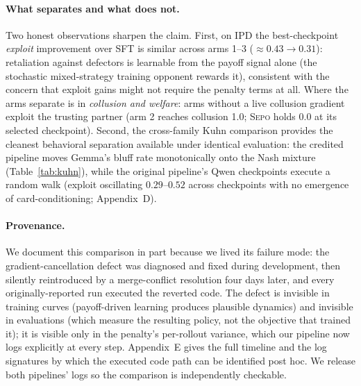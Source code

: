 \documentclass[letterpaper]{article} %
\newcommand{\sepo}{\textsc{Sepo}}
\begin{document}
\paragraph{What separates and what does not.} Two honest observations sharpen the claim. First, on IPD the best-checkpoint \emph{exploit} improvement over SFT is similar across arms 1--3 (${\approx}0.43 \to 0.31$): retaliation against defectors is learnable from the payoff signal alone (the stochastic mixed-strategy training opponent rewards it), consistent with the concern that exploit gains might not require the penalty terms at all. Where the arms separate is in \emph{collusion and welfare}: arms without a live collusion gradient exploit the trusting partner (arm 2 reaches collusion 1.0; \sepo{} holds 0.0 at its selected checkpoint). Second, the cross-family Kuhn comparison provides the cleanest behavioral separation available under identical evaluation: the credited pipeline moves Gemma's bluff rate monotonically onto the Nash mixture (Table~\ref{tab:kuhn}), while the original pipeline's Qwen checkpoints execute a random walk (exploit oscillating $0.29$--$0.52$ across checkpoints with no emergence of card-conditioning; Appendix~D).
\paragraph{Provenance.} We document this comparison in part because we lived its failure mode: the gradient-cancellation defect was diagnosed and fixed during development, then silently reintroduced by a merge-conflict resolution four days later, and every originally-reported run executed the reverted code. The defect is invisible in training curves (payoff-driven learning produces plausible dynamics) and invisible in evaluations (which measure the resulting policy, not the objective that trained it); it is visible only in the penalty's per-rollout variance, which our pipeline now logs explicitly at every step. Appendix~E gives the full timeline and the log signatures by which the executed code path can be identified post hoc. We release both pipelines' logs so the comparison is independently checkable.
\end{document}
